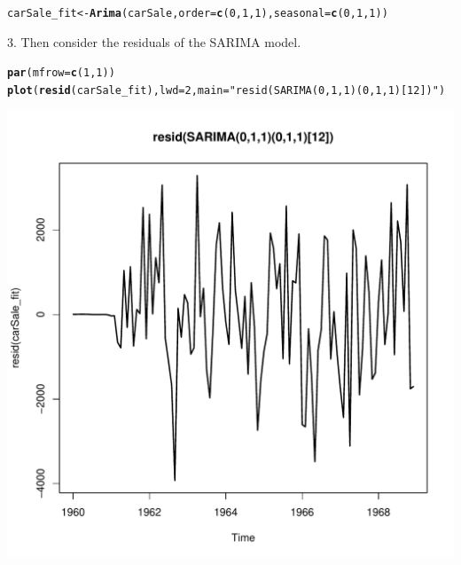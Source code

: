 \documentclass[10pt]{article}\usepackage[]{graphicx}\usepackage[]{color}
\makeatletter
\def\maxwidth{ %
  \ifdim\Gin@nat@width>\linewidth
    \linewidth
  \else
    \Gin@nat@width
  \fi
}
\newcommand{\hlnum}[1]{\textcolor[rgb]{0.686,0.059,0.569}{#1}}%
\newcommand{\hlstr}[1]{\textcolor[rgb]{0.192,0.494,0.8}{#1}}%
\newcommand{\hlstd}[1]{\textcolor[rgb]{0.345,0.345,0.345}{#1}}%
\newcommand{\hlkwb}[1]{\textcolor[rgb]{0.69,0.353,0.396}{#1}}%
\newcommand{\hlkwc}[1]{\textcolor[rgb]{0.333,0.667,0.333}{#1}}%
\newcommand{\hlkwd}[1]{\textcolor[rgb]{0.737,0.353,0.396}{\textbf{#1}}}%
\newenvironment{kframe}{%
 \def\at@end@of@kframe{}%
 \ifinner\ifhmode%
  \def\at@end@of@kframe{\end{minipage}}%
  \begin{minipage}{\columnwidth}%
 \fi\fi%
 \def\FrameCommand##1{\hskip\@totalleftmargin \hskip-\fboxsep
 \colorbox{shadecolor}{##1}\hskip-\fboxsep
     \hskip-\linewidth \hskip-\@totalleftmargin \hskip\columnwidth}%
 \MakeFramed {\advance\hsize-\width
   \@totalleftmargin\z@ \linewidth\hsize
   \@setminipage}}%
 {\par\unskip\endMakeFramed%
 \at@end@of@kframe}
\newenvironment{knitrout}{}{} %
\makeatother
\begin{document}
\begin{knitrout}
\color{fgcolor}\begin{kframe}
\begin{alltt}
\hlstd{carSale_fit} \hlkwb{<-} \hlkwd{Arima}\hlstd{(carSale,} \hlkwc{order} \hlstd{=} \hlkwd{c}\hlstd{(}\hlnum{0}\hlstd{,}\hlnum{1}\hlstd{,}\hlnum{1}\hlstd{),} \hlkwc{seasonal} \hlstd{=} \hlkwd{c}\hlstd{(}\hlnum{0}\hlstd{,}\hlnum{1}\hlstd{,}\hlnum{1}\hlstd{))}
\end{alltt}
\end{kframe}
\end{knitrout}

3. Then consider the residuals of the SARIMA model.
\begin{knitrout}
\color{fgcolor}\begin{kframe}
\begin{alltt}
\hlkwd{par}\hlstd{(}\hlkwc{mfrow}\hlstd{=}\hlkwd{c}\hlstd{(}\hlnum{1}\hlstd{,}\hlnum{1}\hlstd{))}
\hlkwd{plot}\hlstd{(}\hlkwd{resid}\hlstd{(carSale_fit),}\hlkwc{lwd}\hlstd{=}\hlnum{2}\hlstd{,} \hlkwc{main}\hlstd{=}\hlstr{"resid(SARIMA(0,1,1)(0,1,1)[12])"}\hlstd{)}
\end{alltt}
\end{kframe}
\includegraphics[width=\maxwidth]{figure/unnamed-chunk-36-1} 

\end{knitrout}
\end{document}

